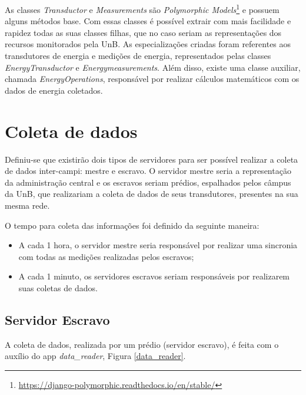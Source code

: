 As classes \textit{Transductor} e \textit{Measurements} são \textit{Polymorphic Models}\footnote{\url{https://django-polymorphic.readthedocs.io/en/stable/}} e possuem alguns métodos base. Com essas classes é possível extrair com mais facilidade e rapidez todas as suas classes filhas, que no caso seriam as representações dos recursos monitorados pela UnB. As especializações criadas foram referentes aos transdutores de energia e medições de energia, representados pelas classes \textit{EnergyTransductor} e \textit{Energymeasurements}. Além disso, existe uma classe auxiliar, chamada \textit{EnergyOperations}, responsável por realizar cálculos matemáticos com os dados de energia coletados.

\section{Coleta de dados}
Definiu-se que existirão dois tipos de servidores para ser possível realizar a coleta de dados inter-campi: mestre e escravo. O servidor mestre seria a representação da administração central e os escravos seriam prédios, espalhados pelos câmpus da UnB, que realizariam a coleta de dados de seus transdutores, presentes na sua mesma rede.

O tempo para coleta das informações foi definido da seguinte maneira:

\begin{itemize}
    \item A cada 1 hora, o servidor mestre seria responsável por realizar uma sincronia com todas as medições realizadas pelos escravos;
    \item A cada 1 minuto, os servidores escravos seriam responsáveis por realizarem suas coletas de dados.
\end{itemize}

\subsection{Servidor Escravo}
A coleta de dados, realizada por um prédio (servidor escravo), é feita com o auxílio do app \textit{data\_reader}, Figura \ref{data_reader}.

